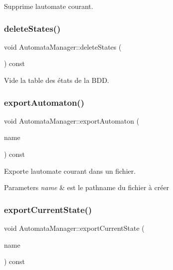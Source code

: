 Supprime l\textquotesingle{}automate courant. 

\mbox{\label{class_automata_manager_a0066613740ed43d595ad32d6d4d75282}} 
\subsubsection{\texorpdfstring{delete\+States()}{deleteStates()}}
{\footnotesize\ttfamily void Automata\+Manager\+::delete\+States (\begin{DoxyParamCaption}{ }\end{DoxyParamCaption}) const}



Vide la table des états de la B\+DD. 

\mbox{\label{class_automata_manager_a32fe2c68595c78f6c4f0f04b3ba73061}} 
\subsubsection{\texorpdfstring{export\+Automaton()}{exportAutomaton()}}
{\footnotesize\ttfamily void Automata\+Manager\+::export\+Automaton (\begin{DoxyParamCaption}\item[{Q\+String const \&}]{name }\end{DoxyParamCaption}) const}



Exporte l\textquotesingle{}automate courant dans un fichier. 


\begin{DoxyParams}{Parameters}
{\em name} & est le pathname du fichier à créer \\
\hline
\end{DoxyParams}
\mbox{\label{class_automata_manager_a1447d0194ceb94e4fc817aced4a5a24d}} 
\subsubsection{\texorpdfstring{export\+Current\+State()}{exportCurrentState()}}
{\footnotesize\ttfamily void Automata\+Manager\+::export\+Current\+State (\begin{DoxyParamCaption}\item[{Q\+String const \&}]{name }\end{DoxyParamCaption}) const}



